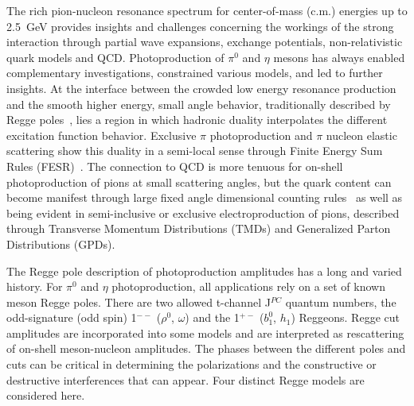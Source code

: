 \documentclass[aps,prc,twocolumn,floatfix,showpacs,preprintnumbers,amsmath,amssymb,superscriptaddress,linenumbers]{revtex4-1}
\begin{document}
The rich pion-nucleon resonance spectrum for center-of-mass 
(c.m.) energies up to 2.5~GeV provides insights and challenges concerning 
the workings of the strong interaction through partial wave expansions, 
exchange potentials, non-relativistic quark models and QCD. Photoproduction of $\pi^0$ and $\eta$ mesons has always enabled complementary investigations, constrained various models, and led to further insights. At the interface between the crowded low energy resonance 
production and the smooth higher energy, small angle behavior, 
traditionally described by Regge poles~\cite{Ader:1967tqj}, lies a 
region in which hadronic duality interpolates the different excitation function
behavior. Exclusive $\pi$ photoproduction and $\pi$ nucleon elastic 
scattering show this duality in a semi-local sense through Finite Energy 
Sum Rules (FESR)~\cite{Armenian:1974xd}. The connection to QCD is more 
tenuous for on-shell photoproduction of pions at small scattering angles, 
but the quark content can become manifest through large fixed angle 
dimensional counting rules~\cite{Brodsky:1973kr} as well as being evident 
in semi-inclusive or exclusive electroproduction of pions, described 
through Transverse Momentum Distributions (TMDs)  and Generalized Parton 
Distributions (GPDs).


The Regge pole description of photoproduction amplitudes 
has a long and varied history. For $\pi^0$ and $\eta$ photoproduction, 
all applications rely on a set of known meson Regge poles. There are 
two allowed t-channel J$^{PC}$ quantum numbers, the odd-signature (odd spin) 
1$^{--}$ ($\rho^0$, $\omega$) and the 1$^{+-}$ ($b^0_1$, $h_1$) Reggeons. Regge cut amplitudes are 
incorporated into some models and are interpreted as rescattering of 
on-shell meson-nucleon amplitudes.  The phases between the different 
poles and cuts can be critical in determining the polarizations and the 
constructive or destructive interferences that can appear. Four distinct Regge models 
are considered here.
\end{document}
